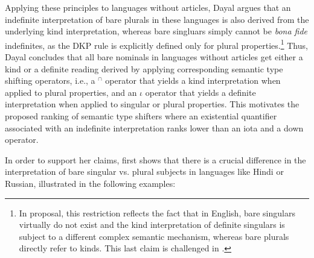 \documentclass[output=paper,colorlinks,citecolor=brown]{langscibook}
\begin{document}
Applying these principles to languages without articles, Dayal argues that an indefinite interpretation of bare plurals in these languages is also derived from the underlying kind interpretation, whereas bare singluars simply cannot be \textit{bona fide} indefinites, as the DKP rule is explicitly defined only for plural properties.\footnote{In  proposal, this restriction reflects the fact that in English, bare singulars virtually do not exist \citep[although see][for exceptions]{stvandiss, deswart15} and the kind interpretation of definite singulars is subject to a different complex semantic mechanism, whereas bare plurals directly refer to kinds. This last claim is challenged in \citet{borikespinal15}.} Thus, Dayal concludes that all bare nominals in languages without articles get either a kind or a definite reading derived by applying corresponding semantic type shifting operators, i.e., a $^{\cap}$ operator that yields a kind interpretation when applied to plural properties, and an $\iota$ operator that yields a definite interpretation when applied to singular or plural properties. This motivates the proposed ranking of semantic type shifters where an existential quantifier associated with an indefinite interpretation ranks lower than an iota and a down operator. 

In order to support her claims, \citet{dayal04} first shows that there is a crucial difference in the interpretation of bare singular vs. plural subjects in languages like Hindi or Russian, illustrated in the following examples:

\ea 
{}
\z
\z

\ea
{}
\z
\z
\end{document}
